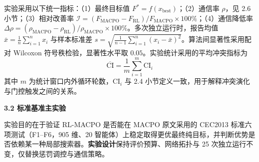 \par
\indent
\par 实验采用以下统一指标：（1）最终目标值 $F^{*}=f(x_{\mathrm{best}})$；（2）通信率 $\rho$，见 2.6 小节；（3）相对改善率 $\mathcal{I}=(F_{\mathrm{MACPO}}-F_{\mathrm{RL}})/F_{\mathrm{MACPO}}\times 100\%$；（4）通信降低率 $\Delta\rho=(\rho_{\mathrm{MACPO}}-\rho_{\mathrm{RL}})/\rho_{\mathrm{MACPO}}\times 100\%$。多次独立运行时，报告均值 $\bar{x}=\frac{1}{n}\sum_{i=1}^{n}x_i$ 与样本标准差 $s=\sqrt{\frac{1}{n-1}\sum_{i=1}^{n}(x_i-\bar{x})^2}$。算法间显著性采用配对 Wilcoxon 符号秩检验，显著性水平取 $0.05$。实验统计采用的平均冲突指标为
\begin{equation}
\overline{\mathrm{CI}}=\frac{1}{m}\sum_{i=1}^{m}\mathrm{CI}_i
\end{equation}
其中 $m$ 为统计窗口内外循环轮数，$\mathrm{CI}_i$ 与 2.4 小节定义一致，用于解释冲突演化与门控触发之间的关系。

\par
\indent
\textbf{3.2 标准基准主实验}
\par
\par
实验目的在于验证 RL-MACPO 是否能在 MACPO 原文采用的 CEC2013 标准六项测试（F1--F6，905 维、20 智能体）上稳定取得更优最终纯目标，并判断优势是否依赖某一种局部搜索器。\textbf{实验设计}保持评价预算、网络拓扑与 25 次独立运行不变，仅替换惩罚调控与通信策略。

\par{}


